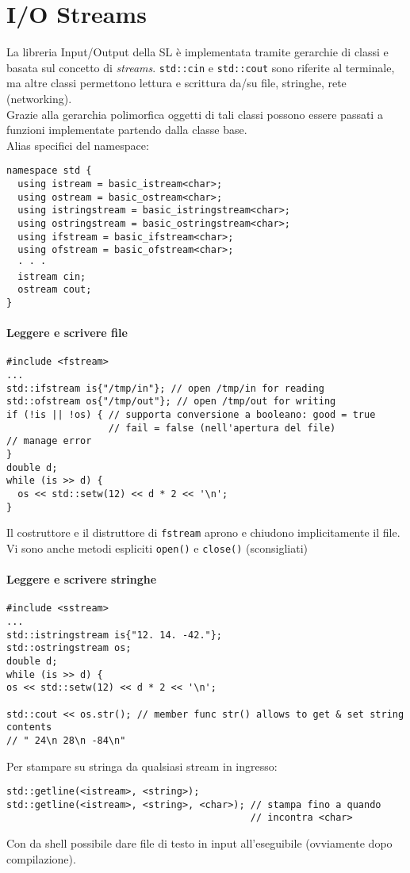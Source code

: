 \documentclass[10pt, oneside]{Book}
\begin{document}
\section{I/O Streams}
La libreria Input/Output della SL è implementata tramite gerarchie di classi e basata sul concetto di \textit{streams}. \texttt{std::cin} e \texttt{std::cout} sono riferite al terminale, ma altre classi permettono lettura e scrittura da/su file, stringhe, rete (networking). 
\\Grazie alla gerarchia polimorfica oggetti di tali classi possono essere passati a funzioni implementate partendo dalla classe base.
\\Alias specifici del namespace:
\begin{verbatim}
namespace std {
  using istream = basic_istream<char>;
  using ostream = basic_ostream<char>;
  using istringstream = basic_istringstream<char>;
  using ostringstream = basic_ostringstream<char>;
  using ifstream = basic_ifstream<char>;
  using ofstream = basic_ofstream<char>;
  · · · 
  istream cin;
  ostream cout;
}
\end{verbatim}
\paragraph{Leggere e scrivere file}
\begin{verbatim}
#include <fstream>
...
std::ifstream is{"/tmp/in"}; // open /tmp/in for reading
std::ofstream os{"/tmp/out"}; // open /tmp/out for writing
if (!is || !os) { // supporta conversione a booleano: good = true
                  // fail = false (nell'apertura del file)
// manage error
}
double d;
while (is >> d) {
  os << std::setw(12) << d * 2 << '\n';
}
\end{verbatim}
Il costruttore e il distruttore di \texttt{fstream} aprono e chiudono implicitamente il file. Vi sono anche metodi espliciti \texttt{open()} e \texttt{close()} (sconsigliati)

\paragraph{Leggere e scrivere stringhe}
\begin{verbatim}
#include <sstream>
...
std::istringstream is{"12. 14. -42."};
std::ostringstream os;
double d;
while (is >> d) {
os << std::setw(12) << d * 2 << '\n';

std::cout << os.str(); // member func str() allows to get & set string contents
// " 24\n 28\n -84\n"
\end{verbatim}
Per stampare su stringa da qualsiasi stream in ingresso:
\begin{verbatim}
std::getline(<istream>, <string>);
std::getline(<istream>, <string>, <char>); // stampa fino a quando
                                           // incontra <char>
\end{verbatim}
Con  da shell possibile dare file di testo in input all'eseguibile (ovviamente dopo compilazione).
\end{document}

